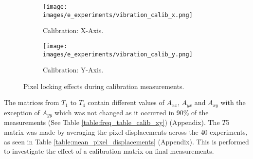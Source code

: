 
    \begin{figure}[h]
        \centering
        \begin{subfigure}{0.49\textwidth}
            \centering
            \texttt{[image: images/e\_experiments/vibration\_calib\_x.png]}
            \caption{Calibration: X-Axis.}
            \label{fig:vibration_calib_x.png}
        \end{subfigure}
        \begin{subfigure}{0.49\textwidth}
            \centering
            \texttt{[image: images/e\_experiments/vibration\_calib\_y.png]}
            \caption{Calibration: Y-Axis.}
            \label{fig:vibration_calib_y.png}
        \end{subfigure}
        \caption{Pixel locking effects during calibration measurements.}
        \label{fig:vibration}
    \end{figure}

    \noindent The matrices from $T_1$ to $T_4$ contain different values of $A_{xx}$, $A_{yx}$ and $A_{xy}$ with the exception of $A_{yy}$ which was not changed as it occurred in 90\% of the measurements (See Table \ref{table:freq_table_calib_xy}) (Appendix). The $T5$ matrix was made by averaging the pixel displacements across the 40 experiments, as seen in Table \ref{table:mean_pixel_displacements} (Appendix). This is performed to investigate the effect of a calibration matrix on final measurements. 

